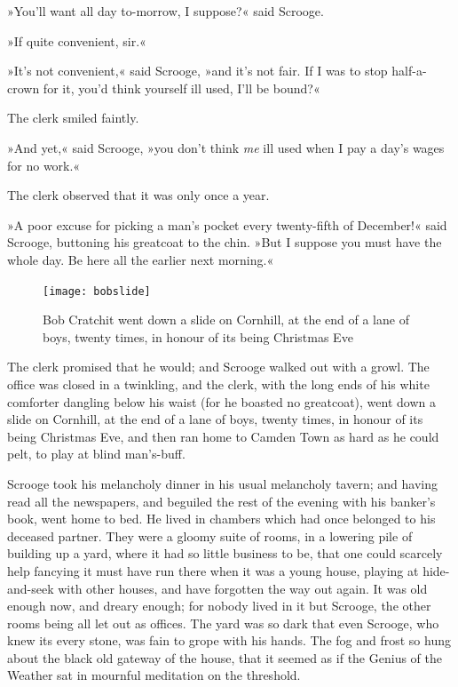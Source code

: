 »You'll want all day to-morrow, I suppose?« said Scrooge.

»If quite convenient, sir.«

»It's not convenient,« said Scrooge, »and it's not fair. If I was to stop half-a-crown for it, you'd think yourself ill used, I'll be bound?«

The clerk smiled faintly.

»And yet,« said Scrooge, »you don't think \textit{me} ill used when I pay a day's wages for no work.«

The clerk observed that it was only once a year.

»A poor excuse for picking a man's pocket every twenty-fifth of December!« said Scrooge, buttoning his greatcoat to the chin. »But I suppose you must have the whole day. Be here all the earlier next morning.«

\begin{figure}[p]
\begin{minipage}[c]{\textwidth}
\texttt{[image: bobslide]}
\caption[\textbf{Bob Cratchit went down a slide}]{Bob Cratchit went down a slide on Cornhill, at the end of a lane of boys, twenty times, in honour of its being Christmas Eve}
\end{minipage}
\end{figure}

The clerk promised that he would; and Scrooge walked out with a growl. The office was closed in a twinkling, and the clerk, with the long ends of his white comforter dangling below his waist (for he boasted no greatcoat), went down a slide on Cornhill, at the end of a lane of boys, twenty times, in honour of its being Christmas Eve, and then ran home to Camden Town as hard as he could pelt, to play at blind man's-buff.

Scrooge took his melancholy dinner in his usual melancholy tavern; and having read all the newspapers, and beguiled the rest of the evening with his banker's book, went home to bed. He lived in chambers which had once belonged to his deceased partner. They were a gloomy suite of rooms, in a lowering pile of building up a yard, where it had so little business to be, that one could scarcely help fancying it must have run there when it was a young house, playing at hide-and-seek with other houses, and have forgotten the way out again. It was old enough now, and dreary enough; for nobody lived in it but Scrooge, the other rooms being all let out as offices. The yard was so dark that even Scrooge, who knew its every stone, was fain to grope with his hands. The fog and frost so hung about the black old gateway of the house, that it seemed as if the Genius of the Weather sat in mournful meditation on the threshold.

